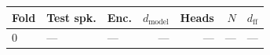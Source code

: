 \begin{tabular}{lllrrrr}
\toprule
Fold & Test spk. & Enc. & $d_{\mathrm{model}}$ & Heads & $N$ & $d_{\mathrm{ff}}$ \\
\midrule
0 & --- & --- & --- & --- & --- & --- \\
\bottomrule
\end{tabular}
